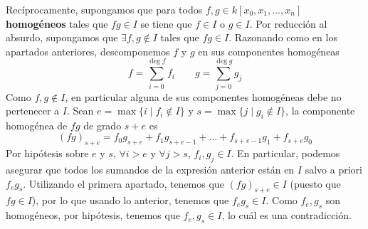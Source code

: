 \documentclass[twoside]{article}
\begin{document}
\begin{solucion}
\begin{enumerate}
Recíprocamente, supongamos que para todos $f, g \in
k[x_0, x_1,\dots, x_n]$ \textbf{homogéneos} tales que $fg \in I$ se tiene que $f \in I$ o $g \in I$. Por reducción al absurdo, supongamos que $\exists f,g \notin I$ tales que $fg\in I$. Razonando como en los apartados anteriores, descomponemos $f$ y $g$ en sus componentes homogéneas
$$
f =\sum_{i=0}^{\deg f} f_i \qquad g =\sum_{j=0}^{\deg g}g_j
$$
Como $f,g\notin I$, en particular alguna de sus componentes homogéneas debe no pertenecer a $I$. Sean $e=\max{\{i\mid f_i\notin I\}}$ y $s=\max{\{j\mid g_i\notin I\}}$, la componente homogénea de $fg$ de grado $s+e$ es 
$$
(fg)_{s+e} = f_0g_{s+e}+f_1g_{s+e-1}+\dotsc + f_{s+e-1}g_1 + f_{s+e}g_0 
$$
Por hipótesis sobre $e$ y $s$, $\forall i >e$ y $\forall j>s$, $f_i,g_j\in I$. En particular, podemos asegurar que todos los sumandos de la expresión anterior están en $I$ salvo a priori $f_eg_s$. Utilizando el primera apartado, tenemos que $(fg)_{s+e}\in I$ (puesto que $fg\in I$), por lo que usando lo anterior, tenemos que $f_eg_s\in I$. Como $f_e,g_s$ son homogéneos, por hipótesis, tenemos que $f_e,g_s\in I$, lo cuál es una contradicción. 
\end{enumerate}
\end{solucion}
\end{document}
